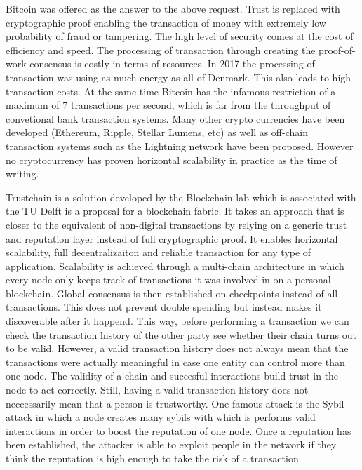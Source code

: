 Bitcoin was offered as the answer to the above request. Trust is replaced with cryptographic
proof enabling the transaction of money with extremely low probability of fraud or tampering. 
The high level of security comes at the cost of efficiency and speed. The processing of 
transaction through creating the proof-of-work consensus is costly in terms of resources. In 
2017 the processing of transaction was using as much energy as all of Denmark. This also 
leads to high transaction costs. At the same time Bitcoin has the infamous restriction of
a maximum of 7 transactions per second, which is far from the throughput of convetional bank
transaction systems. Many other crypto currencies have been developed (Ethereum, Ripple, 
Stellar Lumens, etc) as well as off-chain transaction systems such as the Lightning network 
have been proposed. However no cryptocurrency has proven horizontal scalability in practice
as the time of writing.

Trustchain is a solution developed by the Blockchain lab which is associated with the TU Delft
is a proposal for a blockchain fabric. It takes an approach that is closer to the equivalent
of non-digital transactions by relying on a generic trust and reputation layer instead of 
full cryptographic proof. It enables horizontal scalability, full decentralizaiton
and reliable transaction for any type of application. Scalability is achieved through a multi-chain
architecture in which every node only keeps track of transactions it was involved in on a personal
blockchain. Global consensus is then established on checkpoints instead of all transactions. 
This does not prevent double spending but instead makes it discoverable after it happend. This
way, before performing a transaction we can check the transaction history of the other party 
see whether their chain turns out to be valid. However, a valid transaction history does not 
always mean that the transactions were actually meaningful in case one entity can control 
more than one node. The validity of a chain and succesful interactions build trust in the 
node to act correctly. Still, having a valid transaction history does not neccessarily mean 
that a person is trustworthy. One famous attack is the Sybil-attack in which a node creates many 
sybils with which is performs valid interactions in order to boost the reputation of one node. 
Once a reputation has been established, the attacker is able to exploit people in the network
if they think the reputation is high enough to take the risk of a transaction.